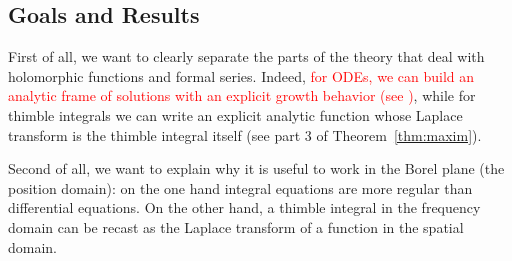 \documentclass{article}
\theoremstyle{definition}
\newcommand{\laplace}{\mathcal{L}}
\newcommand{\borel}{\mathcal{B}}
\begin{document}



\subsection{Goals and Results}

First of all, we want to clearly separate the parts of the theory that deal with holomorphic functions and formal series. Indeed, \textcolor{red}{for ODEs, we can build an analytic frame of solutions with an explicit growth behavior (see \cite[Theorem~4]{reg-sing-volterra})}, while for thimble integrals we can write an explicit analytic function whose Laplace transform is the thimble integral itself (see part 3 of Theorem~\ref{thm:maxim}). 

Second of all, we want to explain why it is useful to work in the Borel plane (the position domain): on the one hand integral equations are more regular than differential equations. On the other hand, a thimble integral in the frequency domain can be recast as the Laplace transform of a function in the spatial domain. 
\end{document}
